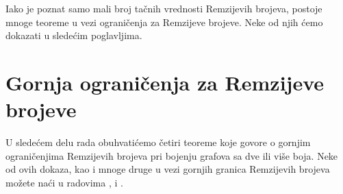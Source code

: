 \documentclass{article}
\theoremstyle{definition}
\newtheorem{teorema}{Teorema}[section]
\newcommand{\dokaz}[1]{\begin{proof}[Dokaz]#1\end{proof}}
\begin{document}

		
	
	
	Iako je poznat samo mali broj tačnih vrednosti Remzijevih brojeva, postoje mnoge teoreme u vezi ograničenja za Remzijeve brojeve. Neke od njih ćemo dokazati u sledećim poglavljima.
	
	
	
	
	\newpage
	
	\section{Gornja ograničenja za Remzijeve brojeve} \label{gornjeGranicePoglavlje}
	
	U sledećem delu rada obuhvatićemo četiri teoreme koje govore o gornjim  ograničenjima Remzijevih brojeva pri bojenju grafova sa dve ili više boja. Neke od ovih dokaza, kao i mnoge druge u vezi gornjih granica Remzijevih brojeva možete naći u radovima \cite{mathPaulErdos}, \cite{remziGr} i \cite{gornjeGr}. 
	

	
\end{document}
